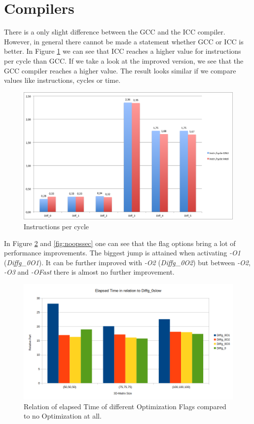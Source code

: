 \documentclass[12pt,a4paper]{article}
\begin{document}
\section{Compilers}

There is a only slight difference between the GCC and the ICC compiler. However, in general there cannot be made a statement whether GCC or ICC is better. In Figure \ref{fig:instrcycle} we can see that ICC reaches a higher value for instructions per cycle than GCC. If we take a look at the improved version, we see that the GCC compiler reaches a higher value. The result looks similar if we compare values like instructions, cycles or time.

\begin{figure}
	\centering
	\includegraphics[width=1.0\linewidth]{"Benchmark/Instrcycle"}
	\caption{Instructions per cycle}
	\label{fig:instrcycle}
\end{figure}

In Figure \ref{fig:Ocompelapsedtime} and \ref{fig:noopssec} one can see that the flag options bring a lot of performance improvements. The biggest jump is attained when activating \emph{-O1} (\emph{Diffg\_0O1}). It can be further improved with \emph{-O2} (\emph{Diffg\_0O2}) but between \emph{-O2}, \emph{-O3} and \emph{-OFast} there is almost no further improvement. 

\begin{figure}
	\centering
	\includegraphics[width=1.0\linewidth]{"Benchmark 3/elapsedtimepercOcomp"}
	\caption{Relation of elapsed Time of different Optimization Flags compared to no Optimization at all.}
	\label{fig:Ocompelapsedtime}
\end{figure}
\end{document}
